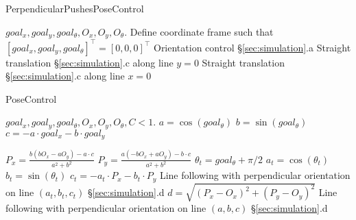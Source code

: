 \begin{algorithm}
\caption{PerpendicularPushesPoseControl}\label{alg:naivePoseControlApproach}
\begin{algorithmic}[1]
\Require $goal_x, goal_y, goal_{\theta},O_x, O_y, O_{\theta}$.
\State Define coordinate frame such that $[goal_x, goal_y, goal_{\theta}]^\top = [0,0,0]^\top$
		\State Orientation control \S\ref{sec:simulation}.a
	\EndWhile
		\State Straight translation \S\ref{sec:simulation}.c along line $y = 0$
	\EndWhile
		\State Straight translation \S\ref{sec:simulation}.c along line $x = 0$
	\EndWhile
\EndWhile
\end{algorithmic}
\end{algorithm}



\begin{algorithm}
\caption{PoseControl}\label{alg:PoseControl}
\begin{algorithmic}[1]
\Require $goal_x, goal_y, goal_{\theta},O_x, O_y, O_{\theta}, C<1$.
\State $a = \cos(goal_{\theta})$ 
\State $b = \sin(goal_{\theta})$
\State $c = -a \cdot goal_x - b \cdot goal_y$

\Repeat 
\State $P_x = \frac{b(bO_x-aO_y)-a\cdot c}{a^2 + b^2}$  
\State $P_y = \frac{a(-bO_x+aO_y)-b\cdot c}{a^2 + b^2}$
\State $\theta_t = goal_{\theta}+\pi/2$
\State $a_t = \cos(\theta_t )$ 
\State $b_t = \sin(\theta_t )$
\State $c_t = -a_t \cdot P_x - b_t \cdot P_y$
\State Line following with perpendicular orientation on line $(a_t,b_t,c_t)$  \S\ref{sec:simulation}.d
\State $d = \sqrt{(P_x-O_x)^2 + (P_y-O_y)^2}$
 
\State Line following with perpendicular orientation on line $(a,b,c)$ \S\ref{sec:simulation}.d
\end{algorithmic}
\end{algorithm}


